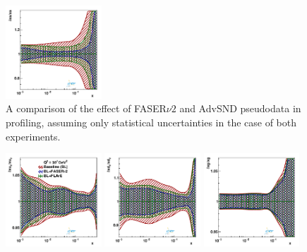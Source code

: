 \begin{figure}[t]
\includegraphics[width=0.32\textwidth]{plots/proton_fasernu2/FASERv2_vs_AdvSND/statOnly_AdvSND_q2_10000_pdf_s_ratio.pdf}
\caption{
A comparison of the effect of FASER$\nu2$ and AdvSND pseudodata in profiling, 
assuming only statistical uncertainties in the case of both experiments.
}
\label{fig:profiling_FASERv2_vs_AdvSND}
\end{figure}

\begin{figure}[t]
\centering
\includegraphics[width=0.32\textwidth]{plots/proton_fasernu2/FASERv2_vs_FLArE10/statOnly_FLArE10_q2_10000_pdf_uv_ratio.pdf}
\includegraphics[width=0.32\textwidth]{plots/proton_fasernu2/FASERv2_vs_FLArE10/statOnly_FLArE10_q2_10000_pdf_dv_ratio.pdf}
\includegraphics[width=0.32\textwidth]{plots/proton_fasernu2/FASERv2_vs_FLArE10/statOnly_FLArE10_q2_10000_pdf_g_ratio.pdf}\\

\end{figure}
